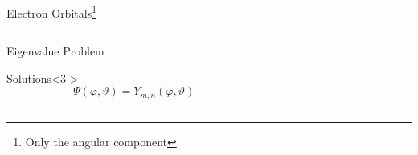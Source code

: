 \documentclass[xetex, onlymath, aspectratio=169]{beamer}
\begin{document}
\begin{frame}{Electron Orbitals\footnote{Only the angular component}}
	
	\begin{columns}
		\begin{column}{.5\linewidth}
    	\begin{block}{Eigenvalue Problem}
    		\only<1>{
      		\[
      			\hat{E}_{k,a} \Psi(\varphi, \vartheta) = E \Psi(\varphi, \vartheta)
      		\]
    		}
    		\only<2->{
    			\[
      			-\frac{\hbar^2}{2m} \nabla^2_s \Psi(\varphi, \vartheta) = E \Psi(\varphi, \vartheta)
      		\]
    		}
    	\end{block}
			\begin{alertblock}{Solutions}<3->
				\[
					\Psi(\varphi, \vartheta) = Y_{m, n} (\varphi, \vartheta)
				\]				
			\end{alertblock}
		\end{column}
		\begin{column}{.5\linewidth}
			

\end{column}
\end{columns}
\end{frame}
\end{document}
